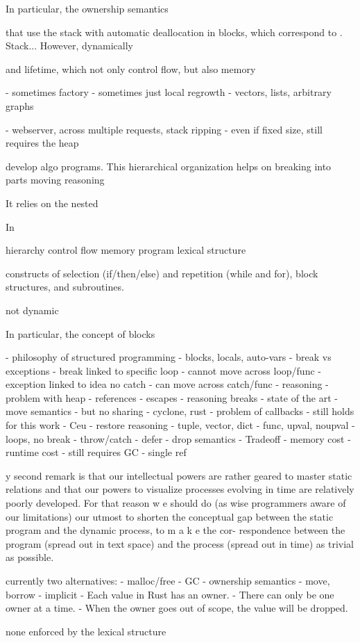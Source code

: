 \documentclass[12pt]{article}
\begin{document}
In particular, the ownership semantics




 that use the stack with automatic
deallocation in blocks, which correspond to .
%
Stack...
However, dynamically



and lifetime, which not only control flow, but also memory

- sometimes factory
- sometimes just local regrowth
    - vectors, lists, arbitrary graphs

- webserver, across multiple requests, stack ripping
    - even if fixed size, still requires the heap




develop algo programs.
%
This hierarchical organization helps on
    breaking into parts
    moving
    reasoning


It relies on the nested 

In

hierarchy
control flow
memory
program lexical structure

constructs of selection (if/then/else) and repetition (while and for), block structures, and subroutines.

not dynamic



In particular, the concept of blocks


- philosophy of structured programming
    - blocks, locals, auto-vars
    - break vs exceptions
        - break linked to specific loop
            - cannot move across loop/func
        - exception linked to idea no catch
            - can move across catch/func
    - reasoning
- problem with heap
    - references
    - escapes
    - reasoning breaks
- state of the art
    - move semantics
    - but no sharing
    - cyclone, rust
        - problem of callbacks
            - still holds for this work
- Ceu
    - restore reasoning
    - tuple, vector, dict
    - func, upval, noupval
    - loops, no break
    - throw/catch
    - defer
    - drop semantics
- Tradeoff
    - memory cost
    - runtime cost
    - still requires GC
    - single ref

 y second remark is that our intellectual powers are rather
geared to master static relations and that our powers to visualize
processes evolving in time are relatively poorly developed. For
that reason w e should do (as wise programmers aware of our
limitations) our utmost to shorten the conceptual gap between
the static program and the dynamic process, to m a k e the cor-
respondence between the program (spread out in text space) and
the process (spread out in time) as trivial as possible.

currently two alternatives:
    - malloc/free
    - GC
    - ownership semantics
        - move, borrow
            - implicit
        - Each value in Rust has an owner.
        - There can only be one owner at a time.
        - When the owner goes out of scope, the value will be dropped.

none enforced by the lexical structure



\label{sec.introduction}



\end{document}
